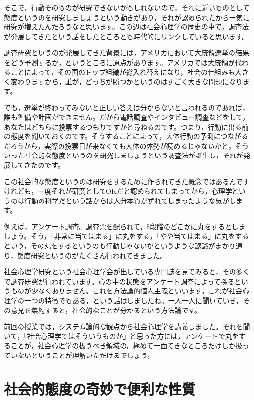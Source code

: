 \documentclass{ltjsbook}
\begin{document}
そこで，行動そのものが研究できないかもしれないので，それに近いものとして態度というのを研究しましょうという動きがあり，それが認められたから一気に研究が増えたんだろうなと思います。この辺は社会心理学の歴史の中で，調査法が発展してきたという話をしたところとも時代的にリンクしていると思います。

調査研究というのが発展してきた背景には，アメリカにおいて大統領選挙の結果をどう予測するか，というところに原点があります。アメリカでは大統領が代わることによって，その国のトップ組織が総入れ替えになり，社会の仕組みも大きく変わりますから，誰が，どっちが勝つかというのはすごく大きな問題になります。

でも，選挙が終わってみないと正しい答えは分からないと言われるのであれば，誰も準備や計画ができません。だから電話調査やインタビュー調査などをして，あなたはどちらに投票するつもりですかと尋ねるのです。つまり，行動に出る前の態度を聞いておくのです。そうすることによって，大体行動の予測につながるだろうから，実際の投票日が来なくても大体の体勢が読めるじゃないかと。そういった社会的な態度というのを研究しましょうという調査法が誕生し，それが発展してきたのです。

この社会的な態度というのは研究をするために作られてきた概念ではあるんですけれども，一度それが研究としてOKだと認められてしまってから，心理学というのは行動の科学だという話からは大分本質がずれてしまったような気がします。

例えば，アンケート調査。調査票を配られて，5段階のどこかに丸をするとしましょう。そう，「非常に当てはまる」に丸をする，「やや当てはまる」に丸をするという，その丸をするというのも行動じゃないかというような認識がまかり通り，態度研究というのがたくさん行われてきました。

社会心理学研究という社会心理学会が出している専門誌を見てみると，その多くで調査研究が行われています。心の中の状態をアンケート調査によって探るというものが少なくありません。これを方法論的個人主義といいます。これが社会心理学の一つの特徴でもある，という話はしましたね。一人一人に聞いていき，その意見を集約すると，社会的なことが分かるという方法論です。

前回の授業では，システム論的な観点から社会心理学を講義しました。それを聞いて，「社会心理学ではそういうものか」と思った方には，アンケートで丸をすることが，社会心理学の扱うべき領域の，極めて一面てきなところだけしか扱っていないということが理解いただけるでしょう。

\section{社会的態度の奇妙で便利な性質}
\end{document}
